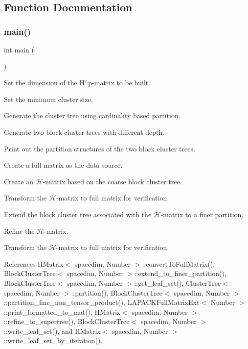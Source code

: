 \subsection{Function Documentation}
\mbox{\label{hmatrix-refinement_8cc_ae66f6b31b5ad750f1fe042a706a4e3d4}} 
\subsubsection{\texorpdfstring{main()}{main()}}
{\footnotesize\ttfamily int main (\begin{DoxyParamCaption}{ }\end{DoxyParamCaption})}

Set the dimension of the H$^\wedge$p-\/matrix to be built.

Set the minimum cluster size.

Generate the cluster tree using cardinality based partition.

Generate two block cluster trees with different depth.

Print out the partition structures of the two block cluster trees.

Create a full matrix as the data source.

Create an $\mathcal{H}$-\/matrix based on the coarse block cluster tree.

Transform the $\mathcal{H}$-\/matrix to full matrix for verification.

Extend the block cluster tree associated with the $\mathcal{H}$-\/matrix to a finer partition.

Refine the $\mathcal{H}$-\/matrix.

Transform the $\mathcal{H}$-\/matrix to full matrix for verification.

References H\+Matrix$<$ spacedim, Number $>$\+::convert\+To\+Full\+Matrix(), Block\+Cluster\+Tree$<$ spacedim, Number $>$\+::extend\+\_\+to\+\_\+finer\+\_\+partition(), Block\+Cluster\+Tree$<$ spacedim, Number $>$\+::get\+\_\+leaf\+\_\+set(), Cluster\+Tree$<$ spacedim, Number $>$\+::partition(), Block\+Cluster\+Tree$<$ spacedim, Number $>$\+::partition\+\_\+fine\+\_\+non\+\_\+tensor\+\_\+product(), L\+A\+P\+A\+C\+K\+Full\+Matrix\+Ext$<$ Number $>$\+::print\+\_\+formatted\+\_\+to\+\_\+mat(), H\+Matrix$<$ spacedim, Number $>$\+::refine\+\_\+to\+\_\+supertree(), Block\+Cluster\+Tree$<$ spacedim, Number $>$\+::write\+\_\+leaf\+\_\+set(), and H\+Matrix$<$ spacedim, Number $>$\+::write\+\_\+leaf\+\_\+set\+\_\+by\+\_\+iteration().

